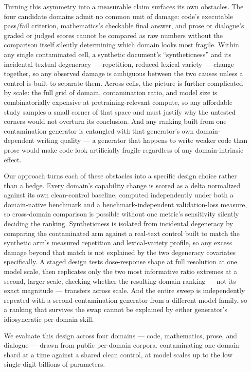 \documentclass[11pt]{article}
\begin{document}
Turning this asymmetry into a measurable claim surfaces its own obstacles. The four candidate domains admit no common unit of damage: code's executable pass/fail criterion, mathematics's checkable final answer, and prose or dialogue's graded or judged scores cannot be compared as raw numbers without the comparison itself silently determining which domain looks most fragile. Within any single contaminated cell, a synthetic document's ``syntheticness'' and its incidental textual degeneracy --- repetition, reduced lexical variety --- change together, so any observed damage is ambiguous between the two causes unless a control is built to separate them. Across cells, the picture is further complicated by scale: the full grid of domain, contamination ratio, and model size is combinatorially expensive at pretraining-relevant compute, so any affordable study samples a small corner of that space and must justify why the untested corners would not overturn its conclusion. And any ranking built from one contamination generator is entangled with that generator's own domain-dependent writing quality --- a generator that happens to write weaker code than prose would make code look artificially fragile regardless of any domain-intrinsic effect.

Our approach turns each of these obstacles into a specific design choice rather than a hedge. Every domain's capability change is scored as a delta normalized against its own clean-control baseline, computed independently under both a domain-native benchmark and a benchmark-independent validation-loss measure, so cross-domain comparison is possible without one metric's sensitivity silently deciding the ranking. Syntheticness is isolated from incidental degeneracy by comparing the contaminated arm against a real-text control built to match the synthetic arm's measured repetition and lexical-variety profile, so any excess damage beyond that match is not explained by the two degeneracy covariates specifically. A staged design tests dose-response shape at full resolution at one model scale, then replicates only the two most informative ratio extremes at a second, larger scale, checking whether the resulting domain ranking --- not its exact magnitude --- transfers across scale. And the entire sweep is independently repeated with a second contamination generator from a different model family, so a ranking that survives the swap cannot be explained by either generator's idiosyncratic per-domain skill.

We evaluate this design across four domains --- code, mathematics, prose, and dialogue --- drawn from public per-domain corpora, contaminating one domain shard at a time against a shared clean control, at model scales up to the low single-digit billions of parameters.
\end{document}
